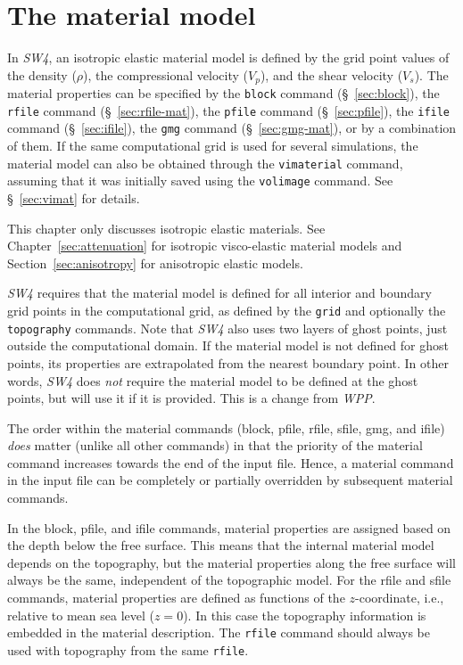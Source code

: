 \documentclass[11pt]{report}
\begin{document}
{%
\chapter{The material model} \label{sec:material}

In \emph{SW4}, an isotropic elastic material model is defined by the grid point values of the density
($\rho$), the compressional velocity ($V_p$), and the shear velocity ($V_s$). The material
properties can be specified by the \verb+block+ command (\S~\ref{sec:block}), the \verb+rfile+ command (\S~\ref{sec:rfile-mat}), the \verb+pfile+
command (\S~\ref{sec:pfile}), the \verb+ifile+ command (\S~\ref{sec:ifile}), the \verb+gmg+ command (\S~\ref{sec:gmg-mat}), or by a combination of
them. If the same computational grid is used for several simulations, the material model can also be
obtained through the \verb+vimaterial+ command, assuming that it was initially saved using the
\verb+volimage+ command. See \S~\ref{sec:vimat} for details.

This chapter only discusses isotropic elastic materials. See Chapter~\ref{sec:attenuation} for
isotropic visco-elastic material models and Section~\ref{sec:anisotropy} for anisotropic elastic
models.

\emph{SW4} requires that the material model is defined for all interior and boundary grid points in
the computational grid, as defined by the {\tt grid} and optionally the {\tt topography}
commands. Note that \emph{SW4} also uses two layers of ghost points, just outside the computational
domain. If the material model is not defined for ghost points, its properties are extrapolated from
the nearest boundary point. In other words, \emph{SW4} does {\em not} require the material model to
be defined at the ghost points, but will use it if it is provided. This is a change from
\emph{WPP}.

The order within the material commands (block, pfile, rfile, sfile, gmg, and ifile) {\em does} matter (unlike
all other commands) in that the priority of the material command increases towards the end of the
input file. Hence, a material command in the input file can be completely or partially overridden by
subsequent material commands.

In the block, pfile, and ifile commands, material properties are assigned based on the depth below
the free surface. This means that the internal material model depends on the topography, but the
material properties along the free surface will always be the same, independent of the topographic
model. For the rfile and sfile commands, material properties are defined as functions of the
$z$-coordinate, i.e., relative to mean sea level ($z=0$). In this case the topography information is
embedded in the material description. The {\tt rfile} command should always be used with topography
from the same {\tt rfile}.

}
\end{document}
